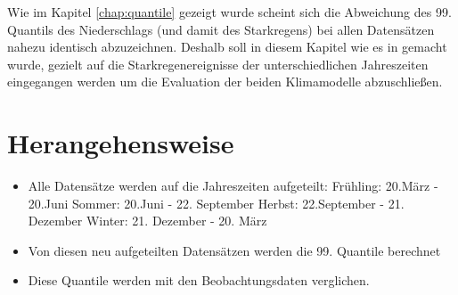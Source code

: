Wie im Kapitel \ref{chap:quantile} gezeigt wurde scheint sich die Abweichung des 99. Quantils des Niederschlags (und damit des Starkregens) bei allen Datensätzen nahezu identisch abzuzeichnen. Deshalb soll in diesem Kapitel wie es in \cite{biasMaraun} gemacht wurde, gezielt auf die Starkregenereignisse der unterschiedlichen Jahreszeiten eingegangen werden um die Evaluation der beiden Klimamodelle abzuschließen.
\section{Herangehensweise}\label{sec:Herangehensweise}
\begin{itemize}
\item Alle Datensätze werden auf die Jahreszeiten aufgeteilt:
	\subitem Frühling: 20.März - 20.Juni
	\subitem Sommer: 20.Juni - 22. September
	\subitem Herbst: 22.September - 21. Dezember
	\subitem Winter: 21. Dezember - 20. März
\item Von diesen neu aufgeteilten Datensätzen werden die 99. Quantile berechnet
\item Diese Quantile werden mit den Beobachtungsdaten verglichen.
\end{itemize}

